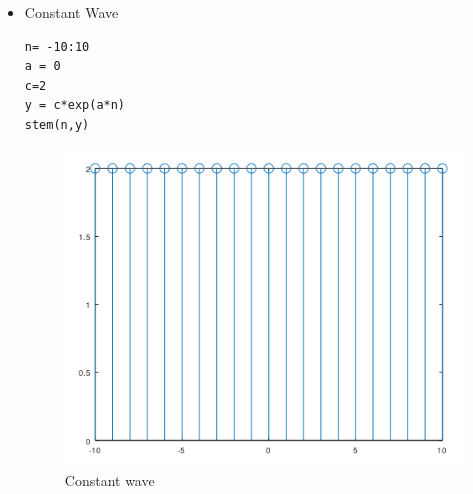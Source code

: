 \documentclass[12pt]{article}
\begin{document}
\begin{enumerate}
\begin{itemize}
        \item Constant Wave\:
        \begin{Verbatim}[frame = single]
n= -10:10
a = 0
c=2
y = c*exp(a*n)
stem(n,y)
        \end{Verbatim}
        \begin{figure}[h!]
            \centering
            \includegraphics[scale =0.7]{labss/Lab2_3c.PNG}
            \caption{Constant wave}
        \end{figure}
        \pagebreak
    \end{itemize}


\end{enumerate}
\end{document}

